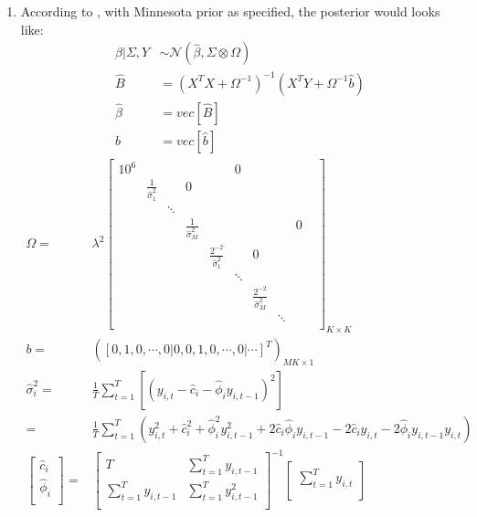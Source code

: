 \documentclass[11pt, oneside]{article}   	%
\begin{document}
\begin{enumerate}[(1)]
\item
According to \cite{giannone2016priors}, with Minnesota prior as specified, the posterior would looks like:
\begin{align}
\beta | \Sigma, Y & \sim \mathcal{N} (\hat{ \beta}, \Sigma \otimes \Omega) \\
\hat {B} &= (X^TX+ \Omega ^{-1}) ^{-1} (X^TY + \Omega ^{-1} \hat{b}) \\
\hat { \beta} & = vec[ \hat {B}] \\
b & = vec[\hat {b}]
\end{align}
\begin{align}
 \Omega = &\lambda^2 
 \begin{bmatrix}
 10^6 & &  & & &  0 &&\\
 & \frac{1}{\hat{ \sigma}^2_1}& &  0& & & &  &\\
  & & \ddots & & & & & \\
  & & & \frac{1}{\hat{ \sigma}_M^2} & && & &0&\\
  & & & &\frac{2 ^{-2}}{\hat{ \sigma}_1^2} &  &0& &\\
    & & & & &\ddots  && &\\
    & & & & &  &\frac{2 ^{-2}}{\hat{ \sigma}_M^2}& & &\\
    & & & & &  & &\ddots & & \\
\end{bmatrix} _{K\times K} \\
b =& ([0,1,0,\cdots,0| 0,0,1,0,\cdots,0|\cdots]^T )_{MK \times 1}\\
\hat { \sigma}_i^2 = & \frac{1}{T}\sum_{t=1}^{T} \left[ (y _{i,t}- \hat {c}_i - \hat { \phi}_iy _{i,t-1}) ^{2} \right] \nonumber \\
=& \frac{1}{T}\sum_{t=1}^{T} (y _{i,t}^2+\hat {c}_i^2 + \hat { \phi}_i^2 y _{i,t-1}^2+2\hat {c}_i \hat { \phi}_i y _{i,t-1}- 2\hat {c}_i y _{i,t}-2\hat { \phi}_i y _{i,t-1} y _{i,t})\\ 
 \begin{bmatrix}
 \hat {c}_i \\
 \hat { \phi}_i \\
\end{bmatrix} =&
\begin{bmatrix}
 T & \sum_{t = 1}^{T} y _{i,t-1} \\
 \sum_{t = 1}^{T} y _{i,t-1} & \sum_{t = 1}^{T} y _{i,t-1}^2 \\
\end{bmatrix} ^{-1}
\begin{bmatrix}
\sum_{t = 1}^{T} y _{i,t} \\

\end{bmatrix}
\end{align}
\end{enumerate}
\end{document}
